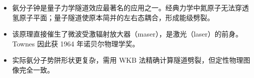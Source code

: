 \begin{insightbox}[物理图像]
\begin{itemize}
    \item 氨分子钟是量子力学隧道效应最著名的应用之一。经典力学中氮原子无法穿透氢原子平面；量子隧道使原本简并的左右态耦合，形成能级劈裂。
    \item 该原理直接催生了微波受激辐射放大器（maser），是激光（laser）的前身。Townes 因此获 1964 年诺贝尔物理学奖。
    \item 实际氨分子势阱形状更复杂，需用 WKB 法精确计算隧道劈裂，但定性物理图像完全一致。
\end{itemize}
\end{insightbox}
